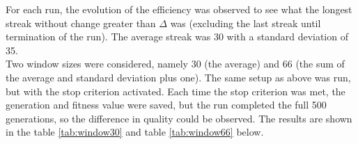 \par\noindent For each run, the evolution of the efficiency was observed to see what the longest streak without change greater than $\Delta$ was (excluding the last streak until termination of the run). The average streak was 30 with a standard deviation of 35.\\
\newline
Two window sizes were considered, namely 30 (the average) and 66 (the sum of the average and standard deviation plus one). The same setup as above was run, but with the stop criterion activated. Each time the stop criterion was met, the generation and fitness value were saved, but the run completed the full 500 generations, so the difference in quality could be observed. The results are shown in the table \ref{tab:window30} and table \ref{tab:window66} below.\\

